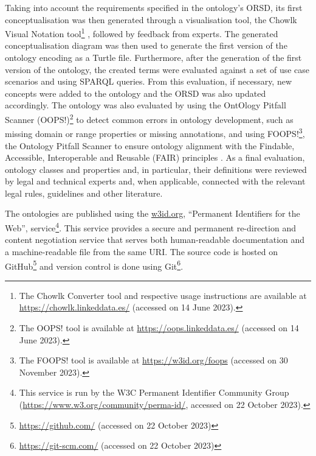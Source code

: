 Taking into account the requirements specified in the ontology's ORSD, its first conceptualisation was then generated through a visualisation tool, the Chowlk Visual Notation tool\footnote{The Chowlk Converter tool and respective usage instructions are available at \url{https://chowlk.linkeddata.es/} (accessed on 14 June 2023).} \citep{chavez-feria_chowlk_2022}, followed by feedback from experts. The generated conceptualisation diagram was then used to generate the first version of the ontology encoding as a Turtle file.
Furthermore, after the generation of the first version of the ontology, the created terms were evaluated against a set of use case scenarios and using SPARQL queries. From this evaluation, if necessary, new concepts were added to the ontology and the ORSD was also updated accordingly. The ontology was also evaluated by using the OntOlogy Pitfall Scanner (OOPS!)\footnote{The OOPS! tool is available at \url{https://oops.linkeddata.es/} (accessed on 14 June 2023).} \citep{poveda-villalon_oops_2014} to detect common errors in ontology development, such as missing domain or range properties or missing annotations, and using FOOPS!\footnote{The FOOPS! tool is available at \url{https://w3id.org/foops} (accessed on 30 November 2023).}, the Ontology Pitfall Scanner to ensure ontology alignment with the Findable, Accessible, Interoperable and Reusable (FAIR) principles \citep{garijo_foops_2021}.
As a final evaluation, ontology classes and properties and, in particular, their definitions were reviewed by legal and technical experts and, when applicable, connected with the relevant legal rules, guidelines and other literature.

The ontologies are published using the \url{w3id.org}, ``Permanent Identifiers for the Web'', service\footnote{This service is run by the W3C Permanent Identifier Community Group (\url{https://www.w3.org/community/perma-id/}, accessed on 22 October 2023).}.
This service provides a secure and permanent re-direction and content negotiation service that serves both human-readable documentation and a machine-readable file from the same URI.
The source code is hosted on GitHub\footnote{\url{https://github.com/} (accessed on 22 October 2023)} and version control is done using Git\footnote{\url{https://git-scm.com/} (accessed on 22 October 2023)}.

